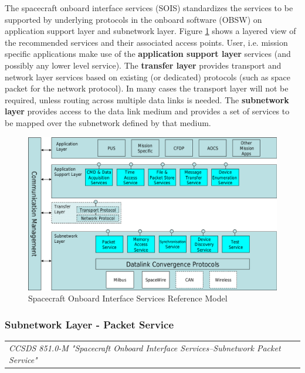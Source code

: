 The spacecraft onboard interface services (SOIS) standardizes the services to be supported by underlying protocols in the onboard software (OBSW) on application support layer and subnetwork layer. Figure \ref{fig:Spacecraft Onboard Interface Services Reference Model} shows a layered view of the recommended services and their associated access points. User, i.e. mission specific applications make use of the \textbf{application support layer} services (and possibly any lower level service). The \textbf{transfer layer} provides transport and network layer services based on existing (or dedicated) protocols (such as space packet for the network protocol). In many cases the transport layer will not be required, unless routing across multiple data links is needed. The \textbf{subnetwork layer} provides access to the data link medium and provides a set of services to be mapped over the subnetwork defined by that medium.

\begin{figure}[h]
\centering\includegraphics[scale=0.4]{fig/spacecraft_onboard_interface_services_reference_model}
\caption{Spacecraft Onboard Interface Services Reference Model}
\label{fig:Spacecraft Onboard Interface Services Reference Model}
\end{figure}


\subsubsection{Subnetwork Layer - Packet Service}

\begin{tabular}{l}
\textit{CCSDS 851.0-M "Spacecraft Onboard Interface Services--Subnetwork Packet Service" \cite{CCSDS 851.0-M}} 
\end{tabular}

